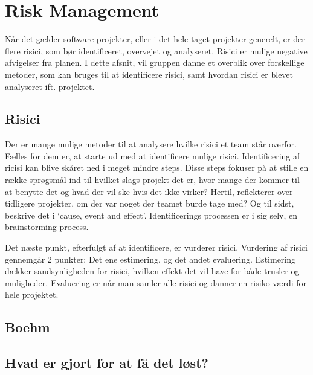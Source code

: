 \chapter{Risk Management}\label{ch:Risk Management}

Når det gælder software projekter, eller i det hele taget projekter generelt, er der flere risici, som bør identificeret, overvejet og analyseret. Risici er mulige negative afvigelser fra planen.\cite{SlideRiskAnalysis} I dette afsnit, vil gruppen danne et overblik over forskellige metoder, som kan bruges til at identificere risici, samt hvordan risici er blevet analyseret ift. projektet. 

\section{Risici}
  
Der er mange mulige metoder til at analysere hvilke risici et team står overfor. Fælles for dem er, at starte ud med at identificere mulige risici. 
Identificering af ricisi kan blive skåret ned i meget mindre steps. \cite{SlideRiskAnalysis} Disse steps fokuser på at stille en række sprøgsmål ind til hvilket slags projekt det er, hvor mange der kommer til at benytte det og hvad der vil ske hvis det ikke virker? Hertil, reflekterer over tidligere projekter, om der var noget der teamet burde tage med? Og til sidst, beskrive det i ‘cause, event and effect’. Identificerings processen er i sig selv, en brainstorming process. 

Det næste punkt, efterfulgt af at identificere, er vurderer risici. Vurdering af risici gennemgår 2 punkter: Det ene estimering, og det andet evaluering. Estimering dækker sandsynligheden for risici, hvilken effekt det vil have for både trusler og muligheder. Evaluering er når man samler alle risici og danner en risiko værdi for hele projektet. 



\section{Boehm}


\section{Hvad er gjort for at få det løst?}